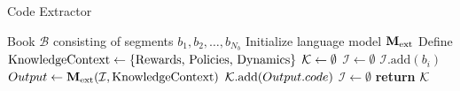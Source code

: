 \begin{algorithm}
\caption{Code Extractor}
\label{alg:code_extractor}
\begin{algorithmic}[1]
\Require Book $\mathcal{B}$ consisting of segments $b_1, b_2, \dots, b_{N_b}$
\State Initialize language model $\mathbf{M}_{\rm ext}$
\State Define ${\rm Knowledge Context} \gets \{\text{Rewards, Policies, Dynamics}\}$
\State $\mathcal{K} \gets \emptyset$
\State $\mathcal{I} \gets \emptyset$
 
    \State $\mathcal{I}.\text{add}(b_i)$
    \State $Output \gets \mathbf{M}_{\rm ext}(\mathcal{I}, {\rm Knowledge Context})$
        \State $\mathcal{K}.\text{add}(Output.code)$
        \State $\mathcal{I} \gets \emptyset$
    \EndIf
\EndFor
\State \textbf{return} $\mathcal{K}$
\end{algorithmic}
\end{algorithm}


